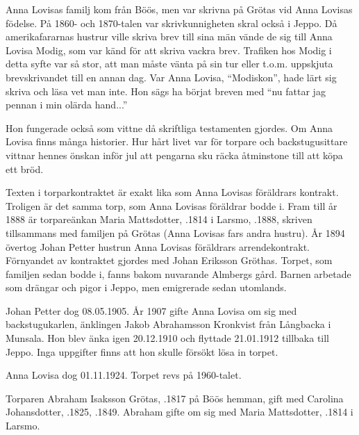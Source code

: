 Anna Lovisas familj kom från Böös, men var skrivna på Grötas vid Anna Lovisas födelse. På 1860- och 1870-talen var skrivkunnigheten skral också i Jeppo. Då amerikafararnas hustrur ville skriva brev till sina män vände de sig till Anna Lovisa Modig, som var känd för att skriva vackra brev. Trafiken hos Modig i detta syfte var så stor, att man måste vänta på sin tur eller t.o.m. uppskjuta brevskrivandet till en annan dag. Var Anna Lovisa, ``Modiskon'', hade lärt sig skriva och läsa vet man inte. Hon sägs ha börjat breven med ``nu fattar jag pennan i min olärda hand...''

Hon fungerade också som vittne då skriftliga testamenten gjordes. Om Anna Lovisa finns många historier. Hur hårt livet var för torpare och backstugusittare vittnar hennes önskan inför jul att pengarna sku räcka åtminstone till att köpa ett bröd.

Texten i torparkontraktet är exakt lika som Anna Lovisas föräldrars kontrakt. Troligen är det samma torp, som Anna Lovisas föräldrar bodde i. Fram till år 1888 är torpareänkan Maria Mattsdotter, .1814 i Larsmo, .1888, skriven tillsammans med familjen på Grötas (Anna Lovisas fars andra hustru). År 1894 övertog Johan Petter  hustrun Anna Lovisas föräldrars arrendekontrakt. Förnyandet av kontraktet gjordes med Johan Eriksson Gröthas. Torpet, som familjen sedan bodde i, fanns bakom nuvarande Almbergs gård. Barnen arbetade som drängar och pigor i Jeppo, men emigrerade sedan utomlands.

Johan Petter dog 08.05.1905. År 1907 gifte Anna Lovisa om sig med backstugukarlen, änklingen Jakob Abrahamsson Kronkvist från Långbacka i Munsala. Hon blev änka igen 20.12.1910 och flyttade 21.01.1912 tillbaka till Jeppo. Inga uppgifter finns att hon skulle försökt lösa in torpet.

Anna Lovisa dog 01.11.1924. Torpet revs på 1960-talet.


Torparen Abraham Isaksson Grötas, .1817 på Böös hemman, gift med Carolina Johansdotter, .1825, .1849. Abraham gifte om sig med Maria Mattsdotter, .1814 i Larsmo.
\begin{jhchildren}
  \item {}
  \item {}
  \item {}
\end{jhchildren}

